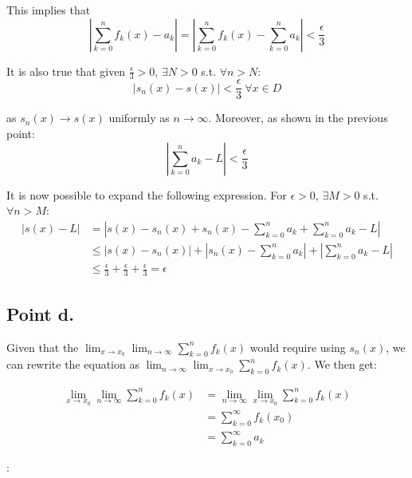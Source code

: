 \begin{homeworkProblem}
This implies that
\begin{equation}
\left| \sum_{k=0}^{n} f_k(x) - a_k\right| = \left| \sum_{k=0}^{n} f_k(x) - \sum_{k=0}^{n}a_k\right| < \frac{\epsilon}{3}    
\end{equation}

It is also true that given $\frac{\epsilon}{3} > 0$, $\exists N > 0$ s.t. $\forall n > N$:
\begin{equation}
 \left| s_n(x) - s(x)\right| < \frac{\epsilon}{3} \ \forall x \in D  
\end{equation}

as $s_n(x) \to s(x)$ uniformly as $n \to \infty$. Moreover, as shown in the previous point:
\begin{equation}
\left| \sum_{k=0}^{n}a_k - L\right| < \frac{\epsilon}{3}    
\end{equation}

It is now possible to expand the following expression. For $\epsilon > 0$, $\exists M > 0$ s.t. $\forall n > M$:
\begin{equation}
    \begin{split}
        \left| s(x) - L\right| & = \left| s(x) - s_n(x) + s_n(x) - \sum_{k=0}^{n}a_k + \sum_{k=0}^{n}a_k - L\right| \\
        &\leq \left| s(x) - s_n(x) \right| + \left| s_n(x) - \sum_{k=0}^{n}a_k \right| + \left| \sum_{k=0}^{n}a_k - L\right| \\
        & \leq \frac{\epsilon}{3} + \frac{\epsilon}{3} + \frac{\epsilon}{3} = \epsilon
    \end{split}
\end{equation}

\subsection{Point d.}

Given that the $\lim_{x \rightarrow x_{0}} \lim_{n \rightarrow \infty} \sum_{k=0}^{n}f_{k}(x)$ would require using $s_{n}(x)$, we can rewrite the equation as $\lim_{n \rightarrow \infty} \lim_{x \rightarrow x_{0}} \sum_{k=0}^{n}f_{k}(x) $. We then get: 

\begin{equation} 
    \begin{split}
        \lim_{x \rightarrow x_{0}} \lim_{n \rightarrow \infty} 
        \sum_{k=0}^{n}f_{k}(x) & = \lim_{n \rightarrow \infty} \lim_{x \rightarrow x_{0}} \sum_{k=0}^{n}f_{k}(x) \\ & = \sum_{k=0}^{\infty} f_{k}(x_{0}) \\ &= \sum_{k=0}^{\infty} a_{k}
    \end{split}
\end{equation}

\end{homeworkProblem}


:

